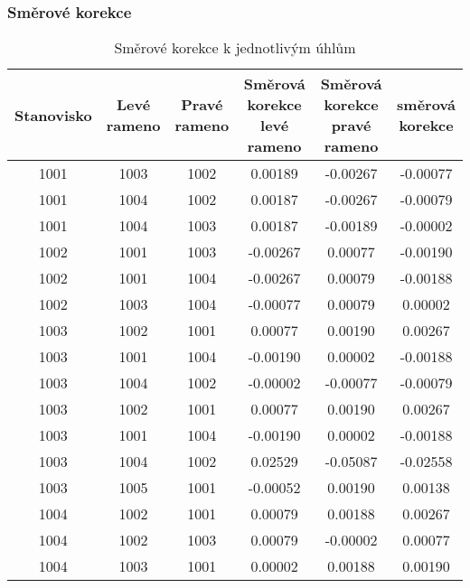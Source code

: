 \subsubsection{Směrové korekce}
\begin{table}[H]
    \centering
    
    \begin{tabular}{|c|c|c||c|c|c|}
        \hline
        Stanovisko & \makecell{Levé\\rameno} & \makecell{Pravé\\rameno} & \makecell{Směrová korekce\\levé rameno} & \makecell{Směrová korekce\\pravé rameno} & \makecell{směrová\\korekce} \\
        \hline
        1001 & 1003 & 1002 & 0.00189 & -0.00267 & -0.00077 \\
        1001 & 1004 & 1002 & 0.00187 & -0.00267 & -0.00079 \\
        1001 & 1004 & 1003 & 0.00187 & -0.00189 & -0.00002 \\
        \hline
        1002 & 1001 & 1003 & -0.00267 & 0.00077 & -0.00190 \\
        1002 & 1001 & 1004 & -0.00267 & 0.00079 & -0.00188 \\
        1002 & 1003 & 1004 & -0.00077 & 0.00079 & 0.00002 \\
        \hline
        1003 & 1002 & 1001 & 0.00077 & 0.00190 & 0.00267 \\
        1003 & 1001 & 1004 & -0.00190 & 0.00002 & -0.00188 \\
        1003 & 1004 & 1002 & -0.00002 & -0.00077 & -0.00079 \\
        1003 & 1002 & 1001 & 0.00077 & 0.00190 & 0.00267 \\
        1003 & 1001 & 1004 & -0.00190 & 0.00002 & -0.00188 \\
        1003 & 1004 & 1002 & 0.02529 & -0.05087 & -0.02558 \\
        1003 & 1005 & 1001 & -0.00052 & 0.00190 & 0.00138 \\
        \hline
        1004 & 1002 & 1001 & 0.00079 & 0.00188 & 0.00267 \\
        1004 & 1002 & 1003 & 0.00079 & -0.00002 & 0.00077 \\
        1004 & 1003 & 1001 & 0.00002 & 0.00188 & 0.00190 \\
        \hline
    \end{tabular}
    \caption{Směrové korekce k jednotlivým úhlům}
\end{table}

